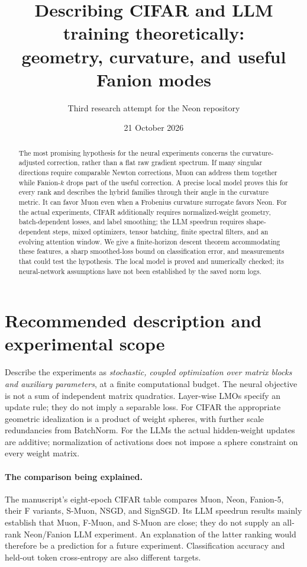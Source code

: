 \documentclass[11pt]{article}
\title{Describing CIFAR and LLM training theoretically:\\geometry, curvature, and useful Fanion modes}
\author{Third research attempt for the Neon repository}
\date{21 October 2026}
\begin{document}
\maketitle

\begin{abstract}
The most promising hypothesis for the neural experiments concerns the
curvature-adjusted correction, rather than a flat raw gradient spectrum.
If many singular directions require comparable Newton corrections, Muon
can address them together while Fanion-$k$ drops part of the useful
correction. A precise local model proves this for every rank and describes
the hybrid families through their angle in the curvature metric.
It can favor Muon even when a Frobenius curvature surrogate favors Neon.
For the actual experiments, CIFAR additionally requires normalized-weight
geometry, batch-dependent losses, and label smoothing; the LLM speedrun
requires shape-dependent steps, mixed optimizers, tensor batching, finite
spectral filters, and an evolving attention window. We give a finite-horizon
descent theorem accommodating these features, a sharp smoothed-loss bound
on classification error, and measurements that could test the hypothesis.
The local model is proved and numerically checked; its neural-network
assumptions have not been established by the saved norm logs.
\end{abstract}

\section{Recommended description and experimental scope}

Describe the experiments as \emph{stochastic, coupled optimization over
matrix blocks and auxiliary parameters}, at a finite computational budget.
The neural objective is not a sum of independent matrix quadratics.
Layer-wise LMOs specify an update rule; they do not imply a separable loss.
For CIFAR the appropriate geometric idealization is a product of weight
spheres, with further scale redundancies from BatchNorm. For the LLMs the
actual hidden-weight updates are additive; normalization of activations
does not impose a sphere constraint on every weight matrix.

\paragraph{The comparison being explained.}
The manuscript's eight-epoch CIFAR table compares Muon, Neon, Fanion-5,
their F variants, S-Muon, NSGD, and SignSGD. Its LLM speedrun results mainly
establish that Muon, F-Muon, and S-Muon are close; they do not supply an
all-rank Neon/Fanion LLM experiment. An explanation of the latter ranking
would therefore be a prediction for a future experiment. Classification
accuracy and held-out token cross-entropy are also different targets.
\end{document}
